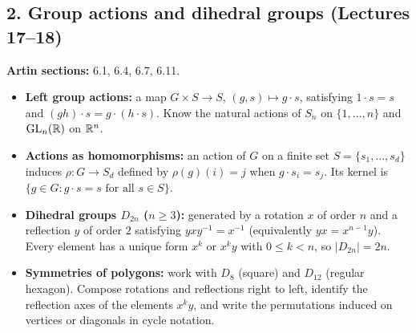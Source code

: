 \documentclass[11pt,reqno]{amsart}
\begin{document}
\subsection*{2. Group actions and dihedral groups (Lectures 17--18)}
\noindent\textbf{Artin sections:} 6.1, 6.4, 6.7, 6.11.\par
\begin{itemize}
\item \textbf{Left group actions:} a map $G\times S\to S$, $(g,s)\mapsto g\cdot s$,
satisfying $1\cdot s=s$ and $(gh)\cdot s=g\cdot(h\cdot s)$. Know the natural actions
of $S_n$ on $\{1,\ldots,n\}$ and $\operatorname{GL}_n(\mathbb{R})$ on $\mathbb{R}^n$.
\item \textbf{Actions as homomorphisms:} an action of $G$ on a finite set
$S=\{s_1,\ldots,s_d\}$ induces $\rho:G\to S_d$ defined by $\rho(g)(i)=j$ when
$g\cdot s_i=s_j$. Its kernel is $\{g\in G:g\cdot s=s\text{ for all }s\in S\}$.
\item \textbf{Dihedral groups $D_{2n}$ ($n\geq3$):} generated by a rotation $x$ of
order $n$ and a reflection $y$ of order $2$ satisfying $yxy^{-1}=x^{-1}$
(equivalently $yx=x^{n-1}y$). Every element has a unique form $x^k$ or $x^ky$ with
$0\leq k<n$, so $|D_{2n}|=2n$.
\item \textbf{Symmetries of polygons:} work with $D_8$ (square) and $D_{12}$
(regular hexagon). Compose rotations and reflections right to left, identify the
reflection axes of the elements $x^ky$, and write the permutations induced on
vertices or diagonals in cycle notation.
\end{itemize}

\newpage
\end{document}
